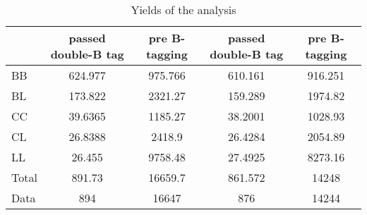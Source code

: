 \documentclass[10pt]{article}
\begin{document}
\begin{table}[htbp]
\begin{center}
\begin{tabular}{|l|S|S|S|S|}
\hline 
 & {passed double-B tag} & {pre B-tagging} & {passed double-B tag} & {pre B-tagging}\\
\hline 
  BB   & 624.977  & 975.766  & 610.161  & 916.251  \\ 
  BL   & 173.822  & 2321.27  & 159.289  & 1974.82  \\ 
  CC   & 39.6365  & 1185.27  & 38.2001  & 1028.93  \\ 
  CL   & 26.8388  & 2418.9  & 26.4284  & 2054.89  \\ 
  LL   & 26.455  & 9758.48  & 27.4925  & 8273.16  \\ 
\hline 
  Total  & 891.73  & 16659.7  & 861.572  & 14248  \\ 
\hline 
  Data   & 894 & 16647 & 876 & 14244 \\ 
\hline 
\end{tabular} 
\caption{Yields of the analysis} 
\end{center} 
\end{table} 
\end{document}
